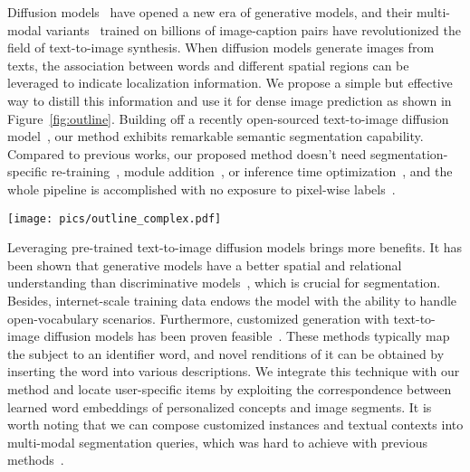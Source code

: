 \documentclass[letterpaper]{article} \usepackage[submission]{aaai24}  \usepackage{times}  \usepackage{helvet}  \usepackage{courier}  \usepackage[hyphens]{url}  \usepackage{graphicx} \urlstyle{rm} \def\UrlFont{\rm}  \usepackage{natbib}  \usepackage{caption} \frenchspacing  \setlength{\pdfpagewidth}{8.5in} \setlength{\pdfpageheight}{11in} \usepackage{algorithm}
\begin{document}
Diffusion models~\cite{score, ddpm} have opened a new era of generative models, and their multi-modal variants~\cite{imagen, stablediffusion} trained on billions of image-caption pairs have revolutionized the field of text-to-image synthesis.
When diffusion models generate images from texts, the association between words and different spatial regions can be leveraged to indicate localization information.
We propose a simple but effective way to distill this information and use it for dense image prediction as shown in Figure~\ref{fig:outline}.
Building off a recently open-sourced text-to-image diffusion model~\cite{stablediffusion}, our method exhibits remarkable semantic segmentation capability.
Compared to previous works, our proposed method doesn't need segmentation-specific re-training~\cite{ddpmseg}, module addition~\cite{ODISE}, or inference time optimization~\cite{peekaboo}, and the whole pipeline is accomplished with no exposure to pixel-wise labels~\cite{SAM}.

\begin{figure*}
  \centering
  \texttt{[image: pics/outline\_complex.pdf]}
  \caption{
  An overview of our proposed framework.
  We first add noise to the image and then input it into the denoising U-net with specially designed text queries.
  Next, we combine cross-attention and self-attention in the model to obtain the correlation map between words and pixels.
  After comparing different correlation maps and post-processing with dense CRF~\cite{dCRF}, we attain pseudo masks at last.
  Best viewed in color.
  }
  \label{fig:outline}
\end{figure*}
Leveraging pre-trained text-to-image diffusion models brings more benefits.
It has been shown that generative models have a better spatial and relational understanding than discriminative models~\cite{ODISE}, which is crucial for segmentation.
Besides, internet-scale training data endows the model with the ability to handle open-vocabulary scenarios.
Furthermore, customized generation with text-to-image diffusion models has been proven feasible~\cite{dreambooth, customdiffusion}.
These methods typically map the subject to an identifier word, and novel renditions of it can be obtained by inserting the word into various descriptions.
We integrate this technique with our method and locate user-specific items by exploiting the correspondence between learned word embeddings of personalized concepts and image segments.
It is worth noting that we can compose customized instances and textual contexts into multi-modal segmentation queries, which was hard to achieve with previous methods~\cite{PALAVRA}.
\end{document}
